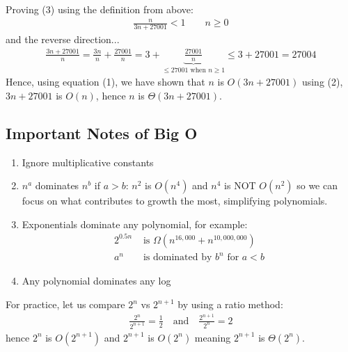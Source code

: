 \documentclass[14pt]{extarticle}
\begin{document}
    Proving (3) using the definition from above:
    \begin{align}
        \frac{n}{3n + 27001} < 1\quad\quad n\geq 0
    \end{align}
    \label{fwdex1}
    and the reverse direction...
    \begin{align}
        \frac{3n + 27001}{n} = \frac{3n}{n} + \frac{27001}{n} 
        = 3 + \underbrace{\frac{27001}{n}}_{\leq 27001 \text{ when } n \geq 1}
        \leq 3 + 27001 = 27004
    \end{align}
    \label{fwdex2}
    Hence, using equation (1), we have shown that $n$ is $O(3n + 27001)$
    using (2), $3n + 27001$ is $O(n)$, hence $n$ is $\Theta(3n + 27001)$.
    \hfill
    \square

    \subsection{Important Notes of Big O}
    \begin{enumerate}
        \item Ignore multiplicative constants 
        \item $n^a$ dominates $n^b$ if $a > b$: $n^2$ is $O(n^4)$ and
            $n^4$ is NOT $O(n^2)$ so we can focus on what contributes to
            growth the most, simplifying polynomials.
        \item Exponentials dominate any polynomial, for example:
            \begin{align*}
                2^{0.5n} &\text{ is } \Omega(n^{16,000} + n^{10,000,000})\\
                a^n &\text{ is dominated by } b^n \text{ for } a < b
            \end{align*}
        \item Any polynomial dominates any log
    \end{enumerate}
    For practice, let us compare $2^n$ vs $2^{n + 1}$ by using a ratio method:
    \begin{align*}
        \frac{2^n}{2^{n+1}} = \frac{1}{2}
        \quad
        \text{and}
        \quad
        \frac{2^{n+1}}{2^n} = 2
    \end{align*}
    hence $2^n$ is $O\left(2^{n+1}\right)$ and $2^{n+1}$ is 
    $O\left(2^n\right)$ meaning $2^{n+1}$ is $\Theta(2^n)$.

    \pagebreak
\end{document}
